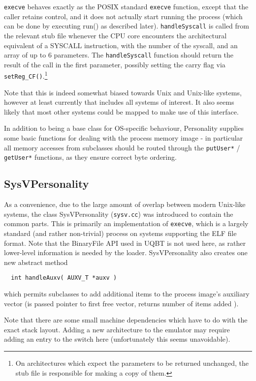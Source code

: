 \texttt{execve} behaves exactly as the POSIX standard \texttt{execve} function,
except that the caller retains control, and it does not actually start
running the process (which can be done by executing run() as described
later). \texttt{handleSyscall} is called from the relevant stub file whenever 
the CPU core encounters the architectural equivalent of a SYSCALL instruction,
with the number of the syscall, and an array of up to 6 parameters. The
\texttt{handleSyscall} function should return the result of the call in the 
first parameter, possibly setting the carry flag via 
\texttt{setReg\_CF()}.\footnote{On architectures which expect the parameters 
to be returned unchanged, the stub file is responsible for making a copy of 
them.}

Note that this is indeed somewhat biased towards Unix and Unix-like
systems, however at least currently that includes all systems of interest.
It also seems likely that most other systems could be mapped to make use
of this interface.

In addition to being a base class for OS-specific behaviour, Personality 
supplies some basic functions for dealing with the process memory image - in 
particular all memory accesses from subclasses should be routed through the 
\texttt{putUser*} / \texttt{getUser*} functions, as they ensure correct 
byte ordering.


\subsection{SysVPersonality}

As a convenience, due to the large amount of overlap between modern
Unix-like systems, the class SysVPersonality (\texttt{sysv.cc}) was introduced 
to contain the common parts. This is primarily an implementation of 
\texttt{execve}, which is a largely standard (and rather non-trivial) process 
on systems supporting the ELF file format. Note that the BinaryFile API used
in UQBT is not used here, as rather lower-level information is
needed by the loader. SysVPersonality also creates one new abstract
method
\begin{verbatim}
  int handleAuxv( AUXV_T *auxv )
\end{verbatim}
which permits subclasses to add additional items to the process image's 
auxiliary vector (is passed pointer to first free vector, returns number of 
items added ). 

Note that there are some small machine dependencies which have to do with
the exact stack layout. Adding a new architecture to the emulator may
require adding an entry to the switch here (unfortunately this seems
unavoidable).


